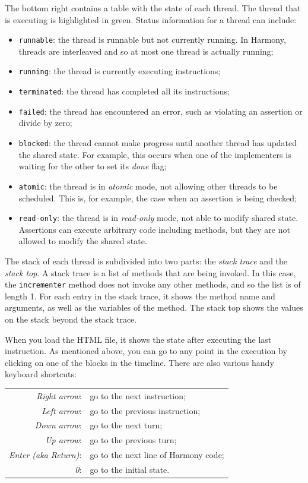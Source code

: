 \documentclass{report}
\begin{document}
The bottom right contains a table with the state of each thread.
The thread that is executing is highlighted in green.
Status information for a thread can include:
\begin{itemize}
\item[] \texttt{runnable}: the thread is runnable but not
currently running.  In Harmony, threads are interleaved and so
at most one thread is actually running;
\item[] \texttt{running}: the thread is currently executing
instructions;
\item[] \texttt{terminated}: the thread has completed all its
instructions;
\item[] \texttt{failed}: the thread has encountered an error,
such as violating an assertion or divide by zero;
\item[] \texttt{blocked}: the thread cannot make progress until
another thread has updated the shared state.  For example, this
occurs when one of the implementers is waiting for the other
to set its \textit{done} flag;
\item[] \texttt{atomic}: the thread is in \emph{atomic} mode,
not allowing other threads to be scheduled.  This is, for example,
the case when an assertion is being checked;
\item[] \texttt{read-only}: the thread is in \emph{read-only} mode,
not able to modify shared state.  Assertions can execute
arbitrary code including methods, but they are not allowed to
modify the shared state.
\end{itemize}

The stack of each thread is subdivided into two parts: the
\emph{stack trace} and the \emph{stack top}.
A stack trace is a list of methods that are being invoked.
In this case, the \texttt{incrementer} method does not invoke any
other methods, and so the list is of length 1.
For each entry in the stack trace, it shows the method name and
arguments, as well as the variables of the method.
The stack top shows the values on the stack beyond the stack trace.

When you load the HTML file, it shows the state after executing
the last instruction.
As mentioned above, you can go to any point in the execution by
clicking on one of the blocks in the timeline.
There are also various handy keyboard shortcuts:
\begin{tabular}{rl}
\emph{Right arrow}: & go to the next instruction; \\
\emph{Left arrow}: & go to the previous instruction; \\
\emph{Down arrow}: & go to the next turn; \\
\emph{Up arrow}: & go to the previous turn; \\
\emph{Enter (aka Return)}: & go to the next line of Harmony code; \\
\emph{0}: & go to the initial state.
\end{tabular}
\end{document}
